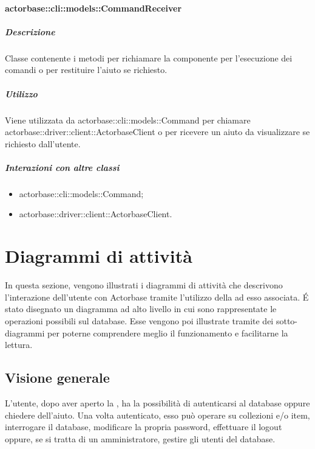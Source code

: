\documentclass{scalatekids-article}
\begin{document}
\paragraph{actorbase::cli::models::CommandReceiver}

\subparagraph{Descrizione}

Classe contenente i metodi per richiamare la componente  per
l'esecuzione dei comandi o per restituire l'aiuto se richiesto.

\subparagraph{Utilizzo}

Viene utilizzata da actorbase::cli::models::Command per chiamare
actorbase::driver::client::ActorbaseClient o per ricevere un aiuto da
visualizzare se richiesto dall'utente.

\subparagraph{Interazioni con altre classi}

\begin{itemize}
\item actorbase::cli::models::Command;
\item actorbase::driver::client::ActorbaseClient.
\end{itemize}

\section{Diagrammi di attività}

In questa sezione, vengono illustrati i diagrammi di attività che descrivono
l'interazione dell'utente con Actorbase tramite l'utilizzo della 
ad esso associata.  É stato disegnato un diagramma ad alto livello in cui sono
rappresentate le operazioni possibili sul database. Esse vengono poi
illustrate tramite dei sotto-diagrammi per poterne comprendere meglio il
funzionamento e facilitarne la lettura.

\subsection{Visione generale}

L'utente, dopo aver aperto la , ha la possibilità di autenticarsi
al database oppure chiedere dell'aiuto. Una volta autenticato, esso può
operare su collezioni e/o item, interrogare il database, modificare la propria
password, effettuare il logout oppure, se si tratta di un amministratore,
gestire gli utenti del database.
\end{document}
